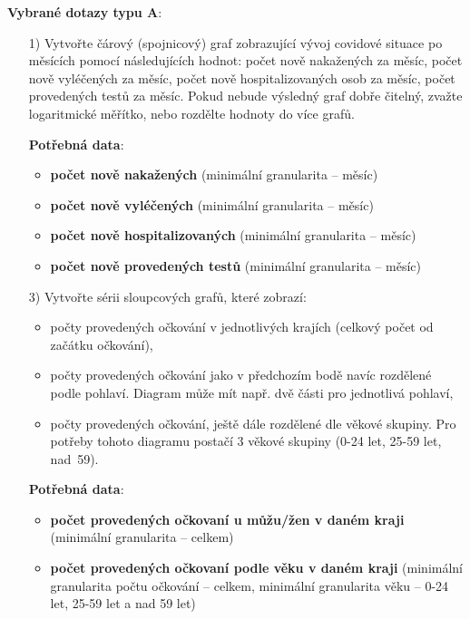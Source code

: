 \documentclass[12pt]{article}
\begin{document}
\textbf{Vybrané dotazy typu A}:
\begin{itemize}
    \item[1)] Vytvořte čárový (spojnicový) graf zobrazující vývoj covidové situace po měsících pomocí následujících hodnot: počet nově nakažených za měsíc, počet nově vyléčených za měsíc, počet nově hospitalizovaných osob za měsíc, počet provedených testů za měsíc. Pokud nebude výsledný graf dobře čitelný, zvažte logaritmické měřítko, nebo rozdělte hodnoty do více grafů.

    \item[] \textbf{Potřebná data}:
    \begin{itemize}
        \item \textbf{počet nově nakažených} (minimální granularita -- měsíc)
        \item \textbf{počet nově vyléčených} (minimální granularita -- měsíc)
        \item \textbf{počet nově hospitalizovaných} (minimální granularita -- měsíc)
        \item \textbf{počet nově provedených testů} (minimální granularita -- měsíc)
    \end{itemize}

    \hspace{1cm}

    \item[3)] Vytvořte sérii sloupcových grafů, které zobrazí:
    \begin{itemize}
        \item počty provedených očkování v jednotlivých krajích (celkový počet od začátku očkování),
        \item počty provedených očkování jako v předchozím bodě navíc rozdělené podle pohlaví. Diagram může mít např. dvě části pro jednotlivá pohlaví,
        \item počty provedených očkování, ještě dále rozdělené dle věkové skupiny. Pro potřeby tohoto diagramu postačí 3 věkové skupiny (0-24 let, 25-59 let, nad~59).
    \end{itemize}

    \item[] \textbf{Potřebná data}:
    \begin{itemize}
        \item \textbf{počet provedených očkovaní u můžu/žen v daném kraji} (minimální granularita -- celkem)
        \item \textbf{počet provedených očkovaní podle věku v daném kraji} (minimální granularita počtu očkování -- celkem, minimální granularita věku -- 0-24 let, 25-59 let a nad 59 let)
    \end{itemize}
\end{itemize}
\end{document}
